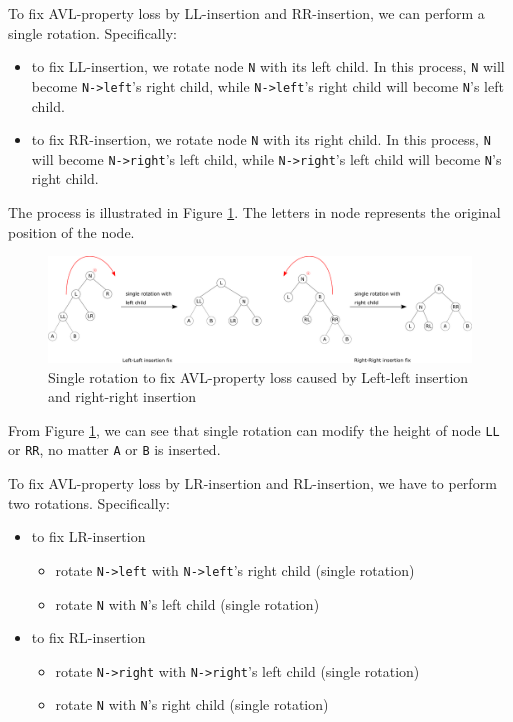 \documentclass[11pt]{book}
\begin{document}
To fix AVL-property loss by LL-insertion and RR-insertion, we can perform a single rotation. Specifically:
\begin{itemize}
\item to fix LL-insertion, we rotate node \texttt{N} with its left child. In this process, \texttt{N} will become \texttt{N->left}'s right child, while \texttt{N->left}'s right child will become \texttt{N}'s left child.
\item to fix RR-insertion, we rotate node \texttt{N} with its right child. In this process, \texttt{N} will become \texttt{N->right}'s left child, while \texttt{N->right}'s left child will become \texttt{N}'s right child.
\end{itemize}

The process is illustrated in Figure \ref{fig:org8237354}. The letters in node represents the original position of the node.

\begin{figure}[htbp]
\centering
\includegraphics[width=500pt]{./img/AVL-LL-RR-insertion-fix.pdf}
\caption[Figure]{\label{fig:org8237354}
Single rotation to fix AVL-property loss caused by Left-left insertion and right-right insertion}
\end{figure}

From Figure \ref{fig:org8237354}, we can see that single rotation can modify the height of node \texttt{LL} or \texttt{RR}, no matter \texttt{A} or \texttt{B} is inserted.


To fix AVL-property loss by LR-insertion and RL-insertion, we have to perform two rotations. Specifically:
\begin{itemize}
\item to fix LR-insertion
\begin{itemize}
\item rotate \texttt{N->left} with \texttt{N->left}'s right child (single rotation)
\item rotate \texttt{N} with \texttt{N}'s left child (single rotation)
\end{itemize}
\item to fix RL-insertion
\begin{itemize}
\item rotate \texttt{N->right} with \texttt{N->right}'s left child (single rotation)
\item rotate \texttt{N} with \texttt{N}'s right child (single rotation)
\end{itemize}
\end{itemize}
\end{document}
